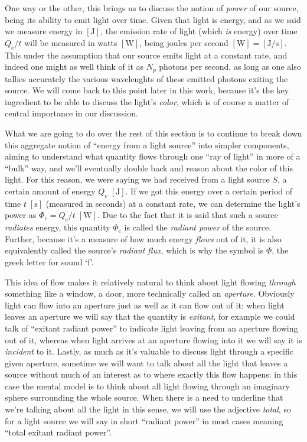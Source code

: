 One way or the other, this brings us to discuss the notion of \textsl{power} of our source, 
being its ability to emit light over time. 
Given that light is energy, and as we said we measure energy in $[\unit\joule]$, the emission 
rate of light (which \emph{is} energy) over time $Q_e/t$ will be measured in 
watts $[\unit\watt]$, being joules per second $[\unit\watt] = [\unit{\joule\per\second}]$. 
This under the assumption that our source emits light at a constant rate, and indeed
one might as well think of it as $N_p$ photons per second, as long as one also tallies
accurately the various wavelenghts of these emitted photons exiting the source.
We will come back to this point later in this work, because it's the key ingredient to be able to
discuss the light's \emph{\gls{color}}, which is of course a matter of central importance in
our discussion.

What we are going to do over the rest of this section is to continue to break down 
this aggregate notion of ``energy from a light source'' into simpler components, aiming 
to understand what quantity flows through one ``ray of light'' in more of a ``bulk'' way,
and we'll eventually double back and reason about the color of this light.
For this reason, we were saying we had received from a light source $S$, a certain amount
of energy $Q_e\;[\unit\joule]$. 
If we got this energy over a certain period of time 
$t\;[\unit\second]$ (measured in seconds) at a constant rate, 
we can determine the light's power as $\Phi_e = Q_e / t\;[\unit\watt]$.
Due to the fact that it is said that such a source \textsl{radiates} energy, this quantity
$\Phi_e$ is called the \textsl{radiant power} of the source. 
Further, because it's a measure of how much energy \textsl{flows} out of it, it is also equivalently
called the source's \textsl{radiant flux}, which is why the symbol is $\Phi$, 
the greek letter for sound `f'.

This idea of flow makes it relatively natural to think about light flowing \emph{through}
something like a window, a door, more technically called an \textsl{\gls{aperture}}. 
Obviously light can flow into an aperture just as well as it can flow out of it:
when light leaves an aperture we will say that the quantity is \textsl{\gls{exitant}},
for example we could talk of ``exitant radiant power'' to indicate light leaving from an
aperture flowing out of it, whereas when light arrives at an aperture flowing into it 
we will say it is \textsl{\gls{incident}} to it. 
Lastly, as much as it's valuable to discuss light through a specific given aperture,
sometime we will want to talk about all the light that leaves a source without much of an
interest as to where exactly this flow happens: in this case the mental model
is to think about all light flowing through an imaginary sphere surrounding the whole source.
When there is a need to underline that we're talking about all the light in this sense, we will use the
adjective \textsl{total}, so for a light source we will say in short ``radiant power'' in
most cases meaning ``total exitant radiant power''.


